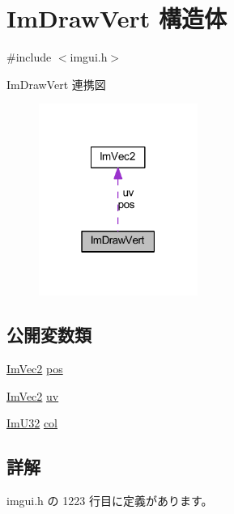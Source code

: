 \hypertarget{struct_im_draw_vert}{}\section{Im\+Draw\+Vert 構造体}
\label{struct_im_draw_vert}


{\ttfamily \#include $<$imgui.\+h$>$}



Im\+Draw\+Vert 連携図\nopagebreak
\begin{figure}[H]
\begin{center}
\leavevmode
\includegraphics[width=147pt]{struct_im_draw_vert__coll__graph}
\end{center}
\end{figure}
\subsection*{公開変数類}
\begin{DoxyCompactItemize}
\item 
\mbox{\hyperlink{struct_im_vec2}{Im\+Vec2}} \mbox{\hyperlink{struct_im_draw_vert_aedc578bbf364ddea71be12b4f177a5b4}{pos}}
\item 
\mbox{\hyperlink{struct_im_vec2}{Im\+Vec2}} \mbox{\hyperlink{struct_im_draw_vert_abdf3183529055a6c3f709b23a4bf06b1}{uv}}
\item 
\mbox{\hyperlink{imgui_8h_a118cff4eeb8d00e7d07ce3d6460eed36}{Im\+U32}} \mbox{\hyperlink{struct_im_draw_vert_ab98ba53ce2690b56f5ba94682ed83940}{col}}
\end{DoxyCompactItemize}


\subsection{詳解}


 imgui.\+h の 1223 行目に定義があります。



